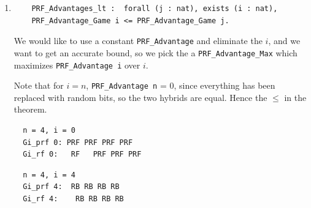 \documentclass[12pt,lot, lof]{puthesis}
\newcommand{\li} {\lstinline}
\begin{document}
{\begin{enumerate}
 \begin{lstlisting}
Definition PRF_Advantage_Game i : Rat := 
  PRF_Advantage RndK ({0,1}^eta) f eqdbl eqdbv (PRF_Adversary i).
  \end{lstlisting}

   We can prove this theorem by simply unfolding the definitions of \li|Gi_prf| and \li|Gi_rf|, because they are both in the form stipulated by \li|PRF_Advantage|. The RF game passes the oracle to an adversary, which returns a guess.
   
\begin{lstlisting}
Definition Gi_rf (i : nat) : Comp bool :=
  [b, _] <-$2 PRF_Adversary i _ _ (randomFunc ({0,1}^eta) eqdbl) nil;
  ret b.
\end{lstlisting}  

The PRF game uniformly samples a random key for the adversary, then passes the adversary the PRF oracle using that key (which it cannot see).

\begin{lstlisting}
Definition Gi_prf (i : nat) : Comp bool :=
  k <-$ RndK;
  [b, _] <-$2 PRF_Adversary i _ _ (f_oracle f _ k) tt;
  ret b.
\end{lstlisting}  
  
  \par
\item 
\begin{lstlisting}
    PRF_Advantages_lt :  forall (j : nat), exists (i : nat), 
    PRF_Advantage_Game i <= PRF_Advantage_Game j.
    \end{lstlisting}
    
    We would like to use a constant \li|PRF_Advantage| and eliminate the $i$, and we want to get an accurate bound, so we pick the a \li|PRF_Advantage_Max| which maximizes \li|PRF_Advantage i| over $i$.
  
 Note that for $i=n$, \li|PRF_Advantage n| = 0, since everything has been replaced with random bits, so the two hybrids are equal. Hence the $\leq$ in the theorem.
    
  \begin{lstlisting}
  n = 4, i = 0
  Gi_prf 0: PRF PRF PRF PRF 
  Gi_rf 0:   RF   PRF PRF PRF 
  \end{lstlisting}
  
  \begin{lstlisting}
  n = 4, i = 4
  Gi_prf 4:  RB RB RB RB
  Gi_rf 4:    RB RB RB RB
  \end{lstlisting}  
    
\end{enumerate}

}
\end{document}
